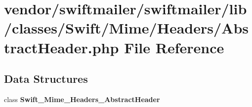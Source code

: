 \section{vendor/swiftmailer/swiftmailer/lib/classes/\+Swift/\+Mime/\+Headers/\+Abstract\+Header.php File Reference}
\label{_abstract_header_8php}
\subsection*{Data Structures}
\begin{DoxyCompactItemize}
\item 
class {\bf Swift\+\_\+\+Mime\+\_\+\+Headers\+\_\+\+Abstract\+Header}
\end{DoxyCompactItemize}
